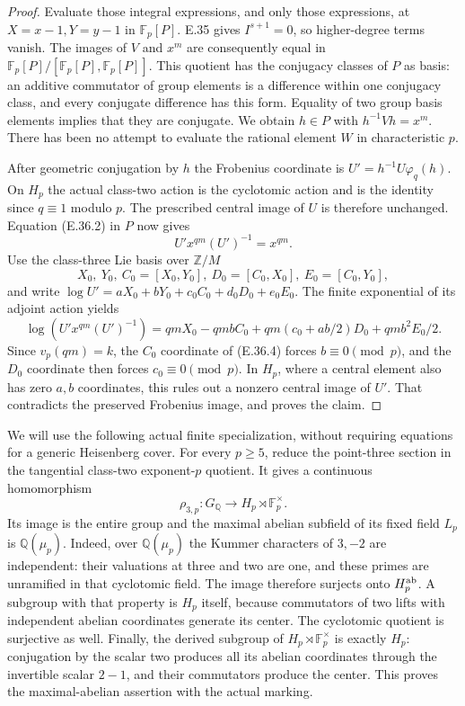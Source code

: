\begin{proof}
Evaluate those integral expressions, and only those expressions,
at $X=x-1,Y=y-1$ in $\mathbb F_p[P]$.  E.35 gives
$I^{s+1}=0$, so higher-degree terms vanish.  The images of $V$
and $x^m$ are consequently equal in
$\mathbb F_p[P]/[\mathbb F_p[P],\mathbb F_p[P]]$.
This quotient has the conjugacy classes of $P$ as basis: an
additive commutator of group elements is a difference within one
conjugacy class, and every conjugate difference has this form.
Equality of two group basis elements implies that they are
conjugate.  We obtain $h\in P$ with $h^{-1}Vh=x^m$.
There has been no attempt to evaluate the rational element $W$
in characteristic $p$.

After geometric conjugation by $h$ the Frobenius coordinate is
$U'=h^{-1}U\varphi_q(h)$.  On $H_p$ the actual class-two action
is the cyclotomic action and is the identity since $q\equiv1$
modulo $p$.  The prescribed central image of $U$ is therefore
unchanged.  Equation (E.36.2) in $P$ now gives
\[
                         U'x^{qm}(U')^{-1}=x^{qm}.
 \tag{E.36.4}
\]
Use the class-three Lie basis over $\mathbb Z/M$
\[
 X_0,\ Y_0,\ C_0=[X_0,Y_0],\
 D_0=[C_0,X_0],\ E_0=[C_0,Y_0],
\]
and write
$\log U'=aX_0+bY_0+c_0C_0+d_0D_0+e_0E_0$.
The finite exponential of its adjoint action yields
\[
 \log(U'x^{qm}(U')^{-1})
 =qmX_0-qmbC_0+
 qm(c_0+ab/2)D_0+qmb^2E_0/2.
 \tag{E.36.5}
\]
Since $v_p(qm)=k$, the $C_0$ coordinate of (E.36.4) forces
$b\equiv0\pmod p$, and the $D_0$ coordinate then forces
$c_0\equiv0\pmod p$.  In $H_p$, where a central element also
has zero $a,b$ coordinates, this rules out a nonzero central
image of $U'$.  That contradicts the preserved Frobenius image,
and proves the claim.
\end{proof}

We will use the following actual finite specialization, without
requiring equations for a generic Heisenberg cover.  For every
$p\ge5$, reduce the point-three section in the tangential class-two
exponent-$p$ quotient.  It gives a continuous homomorphism
\[
 \rho_{3,p}:G_{\mathbb Q}\longrightarrow
                 H_p\rtimes\mathbb F_p^\times.
 \tag{E.37.0}
\]
Its image is the entire group and the maximal abelian subfield
of its fixed field $L_p$ is $\mathbb Q(\mu_p)$.  Indeed, over
$\mathbb Q(\mu_p)$ the Kummer characters of $3,-2$ are independent:
their valuations at three and two are one, and these primes are
unramified in that cyclotomic field.  The image therefore surjects
onto $H_p^{\rm ab}$.  A subgroup with that property is $H_p$
itself, because commutators of two lifts with independent abelian
coordinates generate its center.  The cyclotomic quotient is
surjective as well.  Finally, the derived subgroup of
$H_p\rtimes\mathbb F_p^\times$ is exactly $H_p$: conjugation by
the scalar two produces all its abelian coordinates through the
invertible scalar $2-1$, and their commutators produce the center.
This proves the maximal-abelian assertion with the actual marking.

